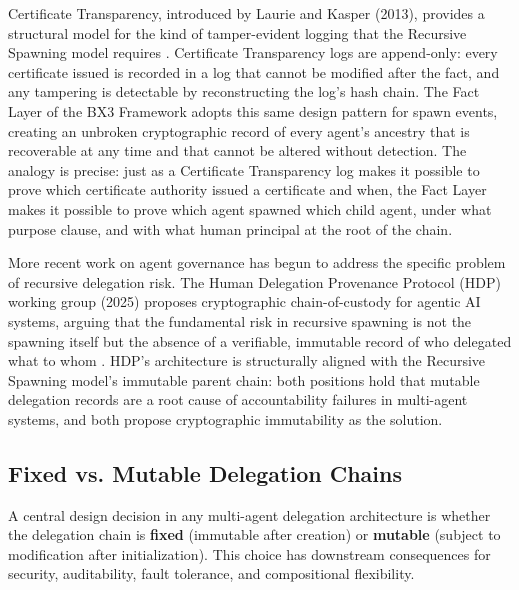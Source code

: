 {{Certificate Transparency, introduced by Laurie and Kasper (2013), provides a structural model for the kind of tamper-evident logging that the Recursive Spawning model requires \cite{laurie2013certificate}. Certificate Transparency logs are append-only: every certificate issued is recorded in a log that cannot be modified after the fact, and any tampering is detectable by reconstructing the log's hash chain. The Fact Layer of the BX3 Framework adopts this same design pattern for spawn events, creating an unbroken cryptographic record of every agent's ancestry that is recoverable at any time and that cannot be altered without detection. The analogy is precise: just as a Certificate Transparency log makes it possible to prove which certificate authority issued a certificate and when, the Fact Layer makes it possible to prove which agent spawned which child agent, under what purpose clause, and with what human principal at the root of the chain.

More recent work on agent governance has begun to address the specific problem of recursive delegation risk. The Human Delegation Provenance Protocol (HDP) working group (2025) proposes cryptographic chain-of-custody for agentic AI systems, arguing that the fundamental risk in recursive spawning is not the spawning itself but the absence of a verifiable, immutable record of who delegated what to whom \cite{hdp-draft}. HDP's architecture is structurally aligned with the Recursive Spawning model's immutable parent chain: both positions hold that mutable delegation records are a root cause of accountability failures in multi-agent systems, and both propose cryptographic immutability as the solution.

\subsection{Fixed vs. Mutable Delegation Chains}
\label{sec:delegation}

A central design decision in any multi-agent delegation architecture is whether the delegation chain is \textbf{fixed} (immutable after creation) or \textbf{mutable} (subject to modification after initialization). This choice has downstream consequences for security, auditability, fault tolerance, and compositional flexibility.

}}
